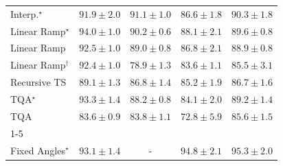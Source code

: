 \begin{tabular}{l|cccc|}
Interp.$^\star$ & {\cellcolor[HTML]{006536}} \color[HTML]{F1F1F1} $91.9\pm 2.0$ & {\cellcolor[HTML]{056C39}} \color[HTML]{F1F1F1} $91.1\pm 1.0$ & {\cellcolor[HTML]{2E924C}} \color[HTML]{F1F1F1} $86.6\pm 1.8$ & {\cellcolor[HTML]{0C723B}} \color[HTML]{F1F1F1} $90.3\pm 1.8$ \\
Linear Ramp$^\star$ & {\cellcolor[HTML]{00512E}} \color[HTML]{F1F1F1} $94.0\pm 1.0$ & {\cellcolor[HTML]{0D733C}} \color[HTML]{F1F1F1} $90.2\pm 0.6$ & {\cellcolor[HTML]{218242}} \color[HTML]{F1F1F1} $88.1\pm 2.1$ & {\cellcolor[HTML]{13773D}} \color[HTML]{F1F1F1} $89.6\pm 0.8$ \\
Linear Ramp & {\cellcolor[HTML]{005F34}} \color[HTML]{F1F1F1} $92.5\pm 1.0$ & {\cellcolor[HTML]{187B3F}} \color[HTML]{F1F1F1} $89.0\pm 0.8$ & {\cellcolor[HTML]{2C8F4B}} \color[HTML]{F1F1F1} $86.8\pm 2.1$ & {\cellcolor[HTML]{197C40}} \color[HTML]{F1F1F1} $88.9\pm 0.8$ \\
Linear Ramp$^\dagger$ & {\cellcolor[HTML]{006034}} \color[HTML]{F1F1F1} $92.4\pm 1.0$ & {\cellcolor[HTML]{90D083}} \color[HTML]{000000} $78.9\pm 1.3$ & {\cellcolor[HTML]{4AB062}} \color[HTML]{F1F1F1} $83.6\pm 1.1$ & {\cellcolor[HTML]{379E54}} \color[HTML]{F1F1F1} $85.5\pm 3.1$ \\
Recursive TS & {\cellcolor[HTML]{177B3F}} \color[HTML]{F1F1F1} $89.1\pm 1.3$ & {\cellcolor[HTML]{2C8F4B}} \color[HTML]{F1F1F1} $86.8\pm 1.4$ & {\cellcolor[HTML]{39A056}} \color[HTML]{F1F1F1} $85.2\pm 1.9$ & {\cellcolor[HTML]{2D914B}} \color[HTML]{F1F1F1} $86.7\pm 1.6$ \\
TQA$^\star$ & {\cellcolor[HTML]{005830}} \color[HTML]{F1F1F1} $93.3\pm 1.4$ & {\cellcolor[HTML]{208242}} \color[HTML]{F1F1F1} $88.2\pm 0.8$ & {\cellcolor[HTML]{43AC5E}} \color[HTML]{F1F1F1} $84.1\pm 2.0$ & {\cellcolor[HTML]{167A3F}} \color[HTML]{F1F1F1} $89.2\pm 1.4$ \\
TQA & {\cellcolor[HTML]{4AB062}} \color[HTML]{F1F1F1} $83.6\pm 0.9$ & {\cellcolor[HTML]{47AE60}} \color[HTML]{F1F1F1} $83.8\pm 1.1$ & {\cellcolor[HTML]{DDF1A6}} \color[HTML]{000000} $72.8\pm 5.9$ & {\cellcolor[HTML]{369D54}} \color[HTML]{F1F1F1} $85.6\pm 1.5$ \\
\cline{1-5}
\multicolumn{5}{c}{\rule{0pt}{8pt}SV} \\
\midrule
Fixed Angles$^\star$ & {\cellcolor[HTML]{034C78}} \color[HTML]{F1F1F1} $93.1\pm 1.4$ & {\cellcolor[HTML]{000000}} \color[HTML]{F1F1F1} {\cellcolor{white}} \color{black} - & {\cellcolor[HTML]{023C5F}} \color[HTML]{F1F1F1} $94.8\pm 2.1$ & {\cellcolor[HTML]{023858}} \color[HTML]{F1F1F1} $95.3\pm 2.0$ \\

\end{tabular}
